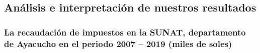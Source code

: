 \documentclass[
  letterpaper,
  DIV=11,
  numbers=noendperiod]{scrartcl}
\begin{document}
\hypertarget{anuxe1lisis-e-interpretaciuxf3n-de-nuestros-resultados}{%
\subsection{Análisis e interpretación de nuestros
resultados}\label{anuxe1lisis-e-interpretaciuxf3n-de-nuestros-resultados}}

\hypertarget{la-recaudaciuxf3n-de-impuestos-en-la-sunat-departamento-de-ayacucho-en-el-periodo-2007-2019-miles-de-soles}{%
\subsubsection{La recaudación de impuestos en la SUNAT, departamento de
Ayacucho en el periodo 2007 -- 2019 (miles de
soles)}\label{la-recaudaciuxf3n-de-impuestos-en-la-sunat-departamento-de-ayacucho-en-el-periodo-2007-2019-miles-de-soles}}
\end{document}
